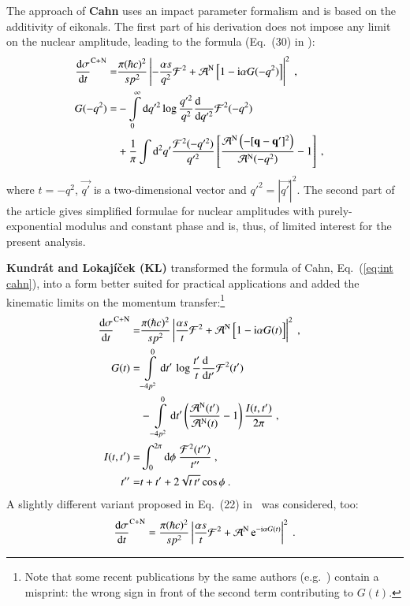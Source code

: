The approach of {\bf Cahn} \cite{cahn82} uses an impact parameter formalism and is based on the additivity of eikonals. The first part of his derivation does not impose any limit on the nuclear amplitude, leading to the formula (Eq.~(30) in \cite{cahn82}):
\begin{equation}
\label{eq:int cahn}
	\begin{aligned}
		{\d\sigma\over \d t}^{\rm C+N} =& {\pi (\hbar c)^2 \over s p^2} \left | -{\alpha s\over q^2} {\cal F}^2
			+ {\cal A}^{\rm N}\, \Big[1 - \I\alpha G(-q^2)\Big] \right |^2\ ,\cr
		G(-q^2) =& - \int\limits_0^\infty \d q'^2 \log {q'^2\over q^2} {\d\phantom{q'^2}\over \d q'^2} {\cal F}^2(-q^2)\cr
				&+ {1\over\pi} \int\d^2 q' {{\cal F}^2(-q'^2)\over q'^2} \left[ {{\cal A}^{\rm N}\left(-[\vec{q} - \vec{q'}]^2\right) \over
					{\cal A}^{\rm N}(-q^2)} - 1 \right]\ , \cr
	\end{aligned}
\end{equation}
where $t=-q^2$, $\vec{q'}$ is a two-dimensional vector and $q'^2 = |\vec{q'}|^2$. The second part of the article gives simplified formulae for nuclear amplitudes with purely-exponential modulus and constant phase and is, thus, of limited interest for the present analysis.

{\bf Kundr\' at and Lokaj\' i\v cek (KL)} \cite{kl94} transformed the formula of Cahn, Eq.~(\ref{eq:int cahn}), into a form better suited for practical applications and added the kinematic limits on the momentum transfer:\footnote{%
Note that some recent publications by the same authors (e.g.~\cite{kl05,kklp11}) contain a misprint: the wrong sign in front of the second term contributing to $G(t)$.
}
\begin{equation}
\label{eq:int kl}
	\begin{aligned}
		{\d\sigma\over \d t}^{\rm C+N} =& {\pi (\hbar c)^2 \over s p^2} \left | {\alpha s\over t} {\cal F}^2
			+ {\cal A}^{\rm N}\, \Big[1 - \I\alpha G(t)\Big] \right |^2\ ,\cr
		G(t) =& \int\limits_{-4p^2}^0 \d t'\, \log {t'\over t} {\d\phantom{t'}\over \d t'} {\cal F}^2(t')\cr
			  &- \int\limits_{-4p^2}^0 \d t' \left( {{\cal A}^{\rm N}(t') \over {\cal A}^{\rm N}(t)} - 1 \right) { I(t, t')\over 2\pi }\ , \cr
		I(t, t') =& \int_0^{2\pi} \d\phi\ {{\cal F}^2(t'')\over t''}\ ,\cr
		t'' =& t + t' + 2\sqrt{t\, t'} \cos\phi\ .\cr
	\end{aligned}
\end{equation}
A slightly different variant proposed in Eq.~(22) in~\cite{kl05} was considered, too:
\begin{equation}
\label{eq:int kl exp}
	{\d\sigma\over \d t}^{\rm C+N} = {\pi (\hbar c)^2 \over s p^2} \left | {\alpha s\over t} {\cal F}^2
		+ {\cal A}^{\rm N}\, \e^{- \I\alpha G(t)} \right |^2 \ .
\end{equation}


